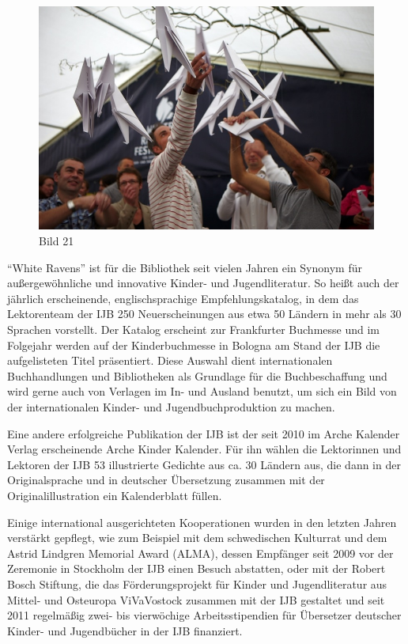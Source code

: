 \documentclass[a4paper,
fontsize=11pt,
oneside,
numbers=noperiodatend,
parskip=half-,
bibliography=totoc,
final
]{scrartcl}
\begin{document}
\begin{figure}[htbp]
\centering
\includegraphics{img/Bild21.jpg}
\caption{Bild 21}
\end{figure}

\enquote{White Ravens} ist für die Bibliothek seit vielen Jahren ein
Synonym für außergewöhnliche und innovative Kinder- und Jugendliteratur.
So heißt auch der jährlich erscheinende, englischsprachige
Empfehlungskatalog, in dem das Lektorenteam der IJB 250 Neuerscheinungen
aus etwa 50 Ländern in mehr als 30 Sprachen vorstellt. Der Katalog
erscheint zur Frankfurter Buchmesse und im Folgejahr werden auf der
Kinderbuchmesse in Bologna am Stand der IJB die aufgelisteten Titel
präsentiert. Diese Auswahl dient internationalen Buchhandlungen und
Bibliotheken als Grundlage für die Buchbeschaffung und wird gerne auch
von Verlagen im In- und Ausland benutzt, um sich ein Bild von der
internationalen Kinder- und Jugendbuchproduktion zu machen.

Eine andere erfolgreiche Publikation der IJB ist der seit 2010 im Arche
Kalender Verlag erscheinende Arche Kinder Kalender. Für ihn wählen die
Lektorinnen und Lektoren der IJB 53 illustrierte Gedichte aus ca. 30
Ländern aus, die dann in der Originalsprache und in deutscher
Übersetzung zusammen mit der Originalillustration ein Kalenderblatt
füllen.

Einige international ausgerichteten Kooperationen wurden in den letzten
Jahren verstärkt gepflegt, wie zum Beispiel mit dem schwedischen
Kulturrat und dem Astrid Lindgren Memorial Award (ALMA), dessen
Empfänger seit 2009 vor der Zeremonie in Stockholm der IJB einen Besuch
abstatten, oder mit der Robert Bosch Stiftung, die das Förderungsprojekt
für Kinder und Jugendliteratur aus Mittel- und Osteuropa ViVaVostock
zusammen mit der IJB gestaltet und seit 2011 regelmäßig zwei- bis
vierwöchige Arbeitsstipendien für Übersetzer deutscher Kinder- und
Jugendbücher in der IJB finanziert.
\end{document}
